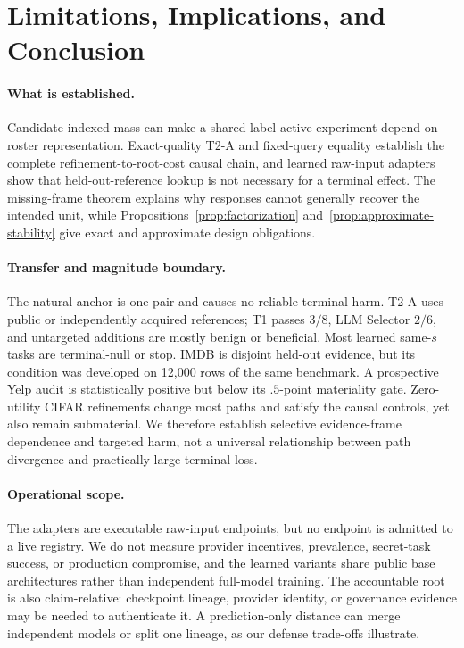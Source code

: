 \section{Limitations, Implications, and Conclusion}
\label{sec:limitations}

\paragraph{What is established.}
Candidate-indexed mass can make a shared-label active experiment depend on roster representation. Exact-quality T2-A and fixed-query equality establish the complete refinement-to-root-cost causal chain, and learned raw-input adapters show that held-out-reference lookup is not necessary for a terminal effect. The missing-frame theorem explains why responses cannot generally recover the intended unit, while Propositions~\ref{prop:factorization} and~\ref{prop:approximate-stability} give exact and approximate design obligations.

\paragraph{Transfer and magnitude boundary.}
The natural anchor is one pair and causes no reliable terminal harm. T2-A uses public or independently acquired references; T1 passes $3/8$, LLM Selector $2/6$, and untargeted additions are mostly benign or beneficial. Most learned same-$s$ tasks are terminal-null or stop. IMDB is disjoint held-out evidence, but its condition was developed on 12,000 rows of the same benchmark. A prospective Yelp audit is statistically positive but below its $.5$-point materiality gate. Zero-utility CIFAR refinements change most paths and satisfy the causal controls, yet also remain submaterial. We therefore establish selective evidence-frame dependence and targeted harm, not a universal relationship between path divergence and practically large terminal loss.

\paragraph{Operational scope.}
The adapters are executable raw-input endpoints, but no endpoint is admitted to a live registry. We do not measure provider incentives, prevalence, secret-task success, or production compromise, and the learned variants share public base architectures rather than independent full-model training. The accountable root is also claim-relative: checkpoint lineage, provider identity, or governance evidence may be needed to authenticate it. A prediction-only distance can merge independent models or split one lineage, as our defense trade-offs illustrate.

